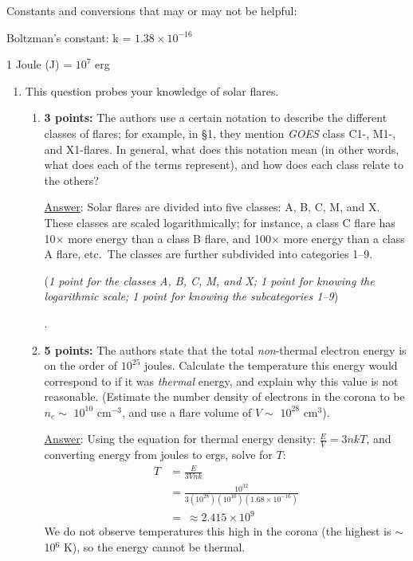 \documentclass[12pt]{article}
\begin{document}
Constants and conversions that may or may not be helpful:
\begin{itemize*}
    \item Boltzman's constant: k = $1.38\times10^{-16}$
    \item 1 Joule (J) = $10^7$ erg
\end{itemize*}

\newpage
\begin{enumerate}
    \item This question probes your knowledge of solar flares.
        \begin{enumerate}
            \item \textbf{3 points:} The authors use a certain notation to
                describe the different classes of flares; for example, in
                \S 1, they mention \emph{GOES} class C1-, M1-, and X1-flares.
                In general, what does this notation mean
                (in other words, what does each of the terms represent),
                and how does each class relate to the others?

                {\small \underline{Answer}: Solar flares are divided
                into five classes: A, B, C, M, and X. These classes are
                scaled logarithmically; for instance, a class C flare has
                10$\times$ more energy than a class B flare, and
                100$\times$ more energy than a class A flare, etc.\ The
                classes are further subdivided into categories 1--9.

                (\emph{1 point for the classes A, B, C, M, and X\@; 1 point
                for knowing the logarithmic scale; 1 point for knowing
                the subcategories 1--9})}.

            \item \textbf{5 points:} The authors state that the total
                \emph{non}-thermal electron
                energy is on the order of $10^{25}$ joules. Calculate the
                temperature this energy would correspond to if it was
                \emph{thermal} energy, and explain why this value is not
                reasonable. (Estimate the number density of electrons in the
                corona to be $n_e \sim$ $10^{10}$ cm$^{-3}$, and use a flare
                volume of $V \sim$ $10^{28}$ cm$^3$).

                {\small \underline{Answer}: Using the equation for thermal
                    energy density: $\frac{E}{V} = 3nkT$, and converting energy
                    from joules to ergs, solve for $T$:
                    \begin{align*}
                        T &= \frac{E}{3Vnk}\\
                        &= \frac{10^{32}}{3(10^{28})(10^{10})(1.68\times10^{-16})}\\
                        &= \ \approx 2.415\times10^{9}
                    \end{align*}
                    We do not observe temperatures this high in the corona
                    (the highest is $\sim$ 10$^{6}$ K), so
                    the energy cannot be thermal.

}
\end{enumerate}
\end{enumerate}
\end{document}
